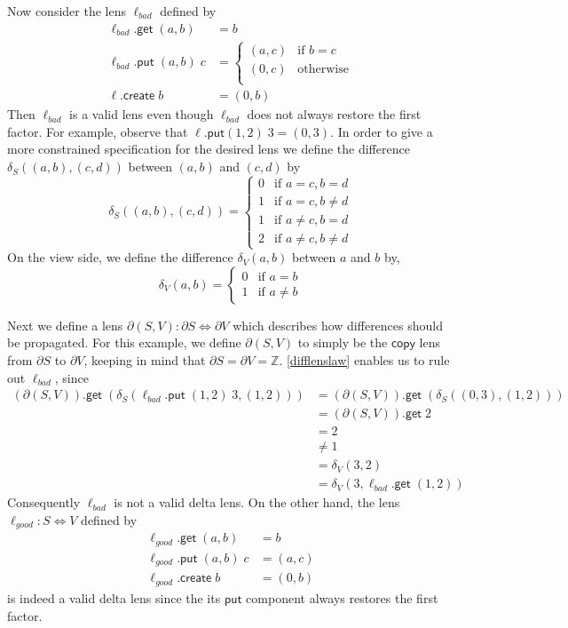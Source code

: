 \documentclass[acmsmall,review,anonymous]{acmart}\settopmatter{printfolios=true,printccs=false,printacmref=false}
\theoremstyle{definition}
\newcommand{\kw}[1]{\ensuremath{\mathsf{#1}}\xspace}
\newcommand{\get}{\ensuremath{\kw{get}}\xspace}
\newcommand{\pput}{\ensuremath{\kw{put}}\xspace}
\newcommand{\create}{\ensuremath{\kw{create}}\xspace}
\newcommand{\ccopy}{\ensuremath{\kw{copy}}\xspace}
\begin{document}
Now consider the lens $\ell_{bad}$ defined by
\begin{align*}
\ell_{bad}.\get \; (a, b) &= b\\
\ell_{bad}.\pput \; (a, b) \; c &= \begin{cases}
(a, c) & \text{if }b = c\\
(0, c) & \text{otherwise}\\
\end{cases}\\
\ell.\create \; b &= (0,b)
\end{align*}
Then $\ell_{bad}$ is a valid lens even though $\ell_{bad}$ does not
always restore the first factor. For example, observe that $\ell.\pput (1, 2) \;
3 = (0,3)$. In order to give a more constrained specification for the desired
lens we define the difference $\delta_S((a, b), (c, d))$ between $(a, b)$ and
$(c, d)$ by $$\delta_S((a, b), (c,
d)) = \begin{cases}
0 & \text{if }a = c, b = d\\
1 & \text{if }a=c, b \neq d\\
1 & \text{if }a \neq c, b = d\\
2 & \text{if }a \neq c, b \neq d
\end{cases}$$
On the view side, we define the difference $\delta_V(a, b)$
between $a$ and $b$ by, $$\delta_V(a, b) = \begin{cases}
0 & \text{if } a = b\\
1 & \text{if } a \neq b
\end{cases}$$

Next we define a lens $\partial(S, V) : \partial S \Leftrightarrow \partial V$
which describes how differences should be propagated. For this example, we
define $\partial(S,V)$ to simply be the \ccopy lens from $\partial S$ to
$\partial V$, keeping in mind that $\partial S = \partial V = \mathbb{Z}$.
\cref{difflenslaw} enables us to rule out $\ell_{bad}$, since
\begin{align*}
(\partial (S, V)).\get \; (\delta_S(\ell_{bad}.\pput \; (1,2) \; 3, (1,2))) &=
(\partial (S, V)).\get \; (\delta_S((0,3), (1,2)))\\
&= (\partial (S, V)).\get \; 2\\
&= 2\\
&\neq 1\\
&= \delta_V(3, 2)\\
&= \delta_V(3, \ell_{bad}.\get \; (1, 2))
\end{align*}
Consequently $\ell_{bad}$ is not a valid delta lens. On the
other hand, the lens $\ell_{good} : S \Leftrightarrow V$ defined by
\begin{align*}
\ell_{good}.\get \; (a, b) &= b\\
\ell_{good}.\pput \; (a, b) \; c &= (a, c)\\
\ell_{good}.\create \; b &= (0, b)
\end{align*}
is indeed a valid delta lens since the its \pput component always restores the
first factor.
\end{document}
